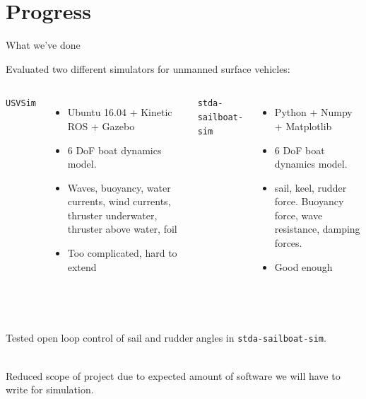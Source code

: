 \documentclass[10pt,xcolor={table,dvipsnames},t]{beamer}
\begin{document}
\section{Progress}
\begin{frame}{What we've done}
    
    
    Evaluated two different simulators for unmanned surface vehicles:
    
    \begin{columns}
        \centerline{\texttt{USVSim} \cite{Paravisi2019}}
        \begin{itemize}
            \item Ubuntu 16.04 + Kinetic ROS + Gazebo
            \item 6 DoF boat dynamics model.
            \item Waves, buoyancy, water currents, wind currents, thruster underwater, thruster above water, foil
            \item Too complicated, hard to extend
        \end{itemize}
        \centerline{\texttt{stda-sailboat-sim} \cite{Buehler2018}}
        \begin{itemize}
            \item Python + Numpy + Matplotlib
            \item 6 DoF boat dynamics model.
            \item sail, keel, rudder force. Buoyancy force, wave resistance, damping forces.
            \item Good enough
        \end{itemize}
    \end{columns}
    
    \hfill\\
    \hfill\\
    Tested open loop control of sail and rudder angles in \texttt{stda-sailboat-sim}.
    
    \hfill\\
    Reduced scope of project due to expected amount of software we will have to write for simulation.
    
\end{frame}
\end{document}
